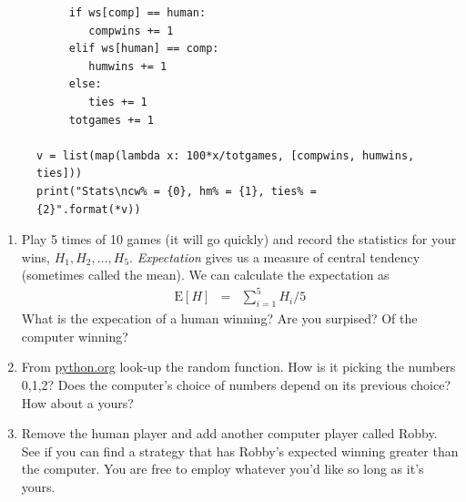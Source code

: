 \documentclass{article}
\begin{document}
\begin{enumerate}
\begin{figure}[h]
{\begin{verbatim}
     if ws[comp] == human:
        compwins += 1
     elif ws[human] == comp:
        humwins += 1
     else:
        ties += 1
     totgames += 1

v = list(map(lambda x: 100*x/totgames, [compwins, humwins, ties]))
print("Stats\ncw% = {0}, hm% = {1}, ties% = {2}".format(*v))
\end{verbatim}}
\end{figure}
\begin{enumerate}
\item Play 5 times of 10 games (it will go quickly) and record the statistics for your wins, $H_1, H_2, \ldots, H_5$.   {\it Expectation} gives us a measure of central tendency (sometimes called the mean).  We can calculate the expectation as
\begin{eqnarray*}
\mathrm{E}[H] &=& \sum_{i=1}^5 H_i/5
\end{eqnarray*}
What is the expecation of a human winning? Are you surpised? Of the computer winning?
\item From \url{python.org} look-up the random function.  How is it picking the numbers 0,1,2?  Does the computer's choice of numbers depend on its previous choice? How about a yours?
\item Remove the human player and add another computer player called Robby.  See if you can find a strategy that has Robby's expected winning greater than the computer.  You are free to employ whatever you'd like so long as it's yours.

\end{enumerate}
\end{enumerate}
\end{document}
